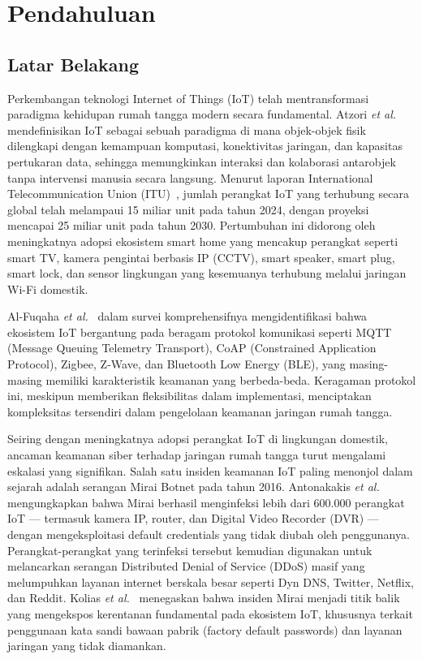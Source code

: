 
\section{Pendahuluan}

\subsection{Latar Belakang}
Perkembangan teknologi Internet of Things (IoT) telah mentransformasi
paradigma kehidupan rumah tangga modern secara fundamental. Atzori
\textit{et al.}~\cite{b5} mendefinisikan IoT sebagai sebuah paradigma di mana
objek-objek fisik dilengkapi dengan kemampuan komputasi, konektivitas
jaringan, dan kapasitas pertukaran data, sehingga memungkinkan interaksi dan
kolaborasi antarobjek tanpa intervensi manusia secara langsung. Menurut
laporan International Telecommunication Union (ITU)~\cite{b7}, jumlah perangkat
IoT yang terhubung secara global telah melampaui 15 miliar unit pada tahun
2024, dengan proyeksi mencapai 25 miliar unit pada tahun 2030. Pertumbuhan ini
didorong oleh meningkatnya adopsi ekosistem smart home yang mencakup perangkat
seperti smart TV, kamera pengintai berbasis IP (CCTV), smart speaker, smart
plug, smart lock, dan sensor lingkungan yang kesemuanya terhubung melalui
jaringan Wi-Fi domestik.

Al-Fuqaha \textit{et al.}~\cite{b6} dalam survei komprehensifnya
mengidentifikasi bahwa ekosistem IoT bergantung pada beragam protokol
komunikasi seperti MQTT (Message Queuing Telemetry Transport), CoAP
(Constrained Application Protocol), Zigbee, Z-Wave, dan Bluetooth Low Energy
(BLE), yang masing-masing memiliki karakteristik keamanan yang berbeda-beda.
Keragaman protokol ini, meskipun memberikan fleksibilitas dalam implementasi,
menciptakan kompleksitas tersendiri dalam pengelolaan keamanan jaringan rumah
tangga.

Seiring dengan meningkatnya adopsi perangkat IoT di lingkungan domestik,
ancaman keamanan siber terhadap jaringan rumah tangga turut mengalami eskalasi
yang signifikan. Salah satu insiden keamanan IoT paling menonjol dalam sejarah
adalah serangan Mirai Botnet pada tahun 2016. Antonakakis
\textit{et al.}~\cite{b1} mengungkapkan bahwa Mirai berhasil menginfeksi lebih
dari 600.000 perangkat IoT --- termasuk kamera IP, router, dan Digital Video
Recorder (DVR) --- dengan mengeksploitasi default credentials yang tidak diubah
oleh penggunanya. Perangkat-perangkat yang terinfeksi tersebut kemudian
digunakan untuk melancarkan serangan Distributed Denial of Service (DDoS) masif
yang melumpuhkan layanan internet berskala besar seperti Dyn DNS, Twitter,
Netflix, dan Reddit. Kolias \textit{et al.}~\cite{b10} menegaskan bahwa insiden
Mirai menjadi titik balik yang mengekspos kerentanan fundamental pada ekosistem
IoT, khususnya terkait penggunaan kata sandi bawaan pabrik (factory default
passwords) dan layanan jaringan yang tidak diamankan.

